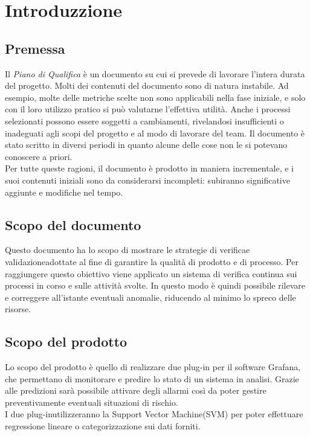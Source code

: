 \section{Introduzzione}
\subsection{Premessa}
Il \textit{Piano di Qualifica} è un documento su cui si prevede di lavorare l'intera durata del progetto. Molti dei contenuti del documento sono di natura instabile. Ad esempio, molte delle metriche scelte non sono applicabili nella fase iniziale, e solo con il loro utilizzo pratico si può valutarne l'effettiva utilità. Anche i processi selezionati possono essere soggetti a cambiamenti, rivelandosi insufficienti o inadeguati agli scopi del progetto e al modo di lavorare del team. Il documento è stato scritto in diversi periodi in quanto alcune delle cose non le si potevano conoscere a priori. \\
Per tutte queste ragioni, il documento è prodotto in maniera incrementale, e i suoi contenuti iniziali sono da considerarsi incompleti: subiranno significative aggiunte e modifiche nel tempo.

\subsection{Scopo del documento}
Questo documento ha lo scopo di mostrare le strategie di verifica\glo e validazione\glo adottate al fine di garantire la qualità di prodotto e di processo. Per raggiungere questo obiettivo viene applicato un sistema di verifica continua sui processi in corso e sulle attività svolte. In questo modo è quindi possibile rilevare e correggere all'istante eventuali anomalie, riducendo al minimo lo spreco delle risorse.

\subsection{Scopo del prodotto}
Lo scopo del prodotto è quello di realizzare due plug-in per il software Grafana\glo, che permettano di monitorare e predire lo stato di un sistema in analisi. Grazie alle predizioni sarà possibile attivare degli allarmi così da poter gestire preventivamente eventuali situazioni di rischio. \\
I due plug-in\glo utilizzeranno la Support Vector Machine\glo (SVM) per poter effettuare regressione lineare o categorizzazione sui dati forniti.

